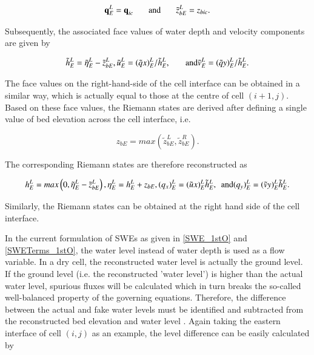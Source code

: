 \documentclass[11pt,english,a4paper]{article}
\begin{document}
\begin{equation}
	\label{SWE_1stO_FaceValues}
	\textbf{q}_{E}^{L} = \textbf{q}_{ic}
	\hspace{4ex} \textrm{and} \hspace{4ex}
	\tilde{z}_{bE}^{L} = z_{bic}
	.
\end{equation}

Subsequently, the associated face values of water depth and velocity components are given by

\begin{equation}
	\label{SWE_1stO_FaceValues_huv}
	\tilde{h}_{E}^{L} = \tilde{\eta}_{E}^{L} - \tilde{z}_{bE}^{L}, \\
	\tilde{u}_{E}^{L} = (\tilde{q}x)_{E}^{L} / \tilde{h}_{E}^{L},
	\hspace{4ex} \textrm{and} \hspace{4ex}	\\
	\tilde{v}_{E}^{L} = (\tilde{q}y)_{E}^{L} / \tilde{h}_{E}^{L}
	.
\end{equation}

The face values on the right-hand-side of the cell interface can be obtained in a similar way, which is actually equal to those at the centre of cell $(i + 1, j)$. Based on these face values, the Riemann states are derived after defining a single value of bed elevation across the cell interface, i.e.

\begin{equation}
	\label{SWE_1stO_BedElev}
	z_{bE} = max \left ( \tilde{z}_{bE}^{L}, \tilde{z}_{bE}^{R} \right )
	.
\end{equation}

The corresponding Riemann states are therefore reconstructed as

\begin{equation}
	\label{SWE_1stO_Reconstruction}
	h_{E}^{L} = max \left ( 0, \tilde{\eta}_{E}^{L} - \tilde{z}_{bE}^{L} \right ), \\
	\eta_{E}^{L} = h_{E}^{L} + z_{bE}, \\
	(q_{x})_{E}^{L} = (\tilde{u}x)_{E}^{L} \tilde{h}_{E}^{L},
	\hspace{1ex} \textrm{and} \hspace{1ex}	\\
	(q_{y})_{E}^{L} = (\tilde{v}y)_{E}^{L} \tilde{h}_{E}^{L}
	.
\end{equation}


Similarly, the Riemann states can be obtained at the right hand side of the cell interface.

In the current formulation of SWEs as given in \ref{SWE_1stO} and \ref{SWETerms_1stO}, the water level instead of water depth is used as a flow variable. In a dry cell, the reconstructed water level is actually the ground level. If the ground level (i.e. the reconstructed 'water level') is higher than the actual water level, spurious fluxes will be calculated which in turn breaks the so-called well-balanced property of the governing equations. Therefore, the difference between the actual and fake water levels must be identified and subtracted from the reconstructed bed elevation and water level \citep{Liang2010a}. Again taking the eastern interface of cell $(i, j)$ as an example, the level difference can be easily calculated by
\end{document}
